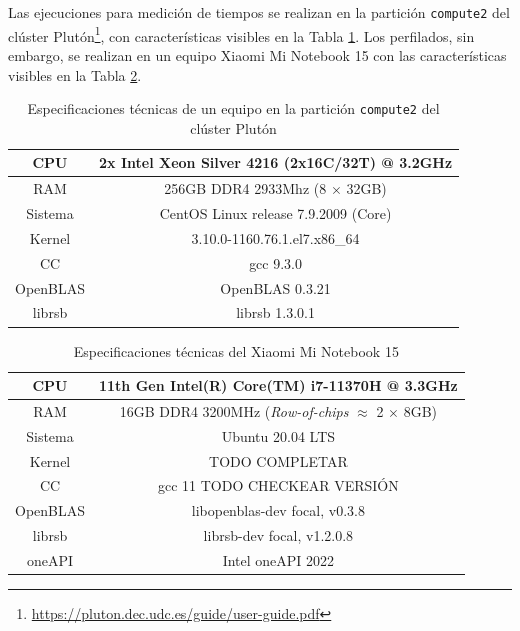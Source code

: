 Las ejecuciones para medición de tiempos se realizan en la partición \texttt{compute2} del clúster Plutón\footnote{\url{https://pluton.dec.udc.es/guide/user-guide.pdf}}, con características visibles en la Tabla \ref{tb:especificaciones_compute2}. Los perfilados, sin embargo, se realizan en un equipo Xiaomi Mi Notebook 15 con las características visibles en la Tabla \ref{tb:especificaciones_xiaomi}.
\begin{table}
    \centering
    \begin{tabular}{|c|c|}
        \hline
        CPU & 2x Intel Xeon Silver 4216 (2x16C/32T) @ 3.2GHz\\\hline
        RAM & 256GB DDR4 2933Mhz (8 $\times$ 32GB)\\\hline
        Sistema & CentOS Linux release 7.9.2009 (Core) \\\hline
        Kernel & 3.10.0-1160.76.1.el7.x86\_64 \\\hline
        CC & gcc 9.3.0\\\hline
        OpenBLAS & OpenBLAS 0.3.21\\\hline
        librsb & librsb 1.3.0.1\\\hline
    \end{tabular}
    \caption{\label{tb:especificaciones_compute2}Especificaciones técnicas de un equipo en la partición \texttt{compute2} del clúster Plutón}
    \end{table}

\begin{table}
\centering
\begin{tabular}{|c|c|}
    \hline
    CPU & 11th Gen Intel(R) Core(TM) i7-11370H @ 3.3GHz\\\hline
    RAM & 16GB DDR4 3200MHz (\textit{Row-of-chips} {\small$\approx$} 2 $\times$ 8GB)\\\hline
    Sistema & Ubuntu 20.04 LTS\\\hline
    Kernel & TODO COMPLETAR \\\hline
    CC & gcc 11 TODO CHECKEAR VERSIÓN\\\hline
    OpenBLAS & libopenblas-dev focal, v0.3.8\\\hline
    librsb & librsb-dev focal, v1.2.0.8\\\hline
    oneAPI & Intel oneAPI 2022\\\hline
\end{tabular}
\caption{\label{tb:especificaciones_xiaomi}Especificaciones técnicas del Xiaomi Mi Notebook 15}
\end{table}


